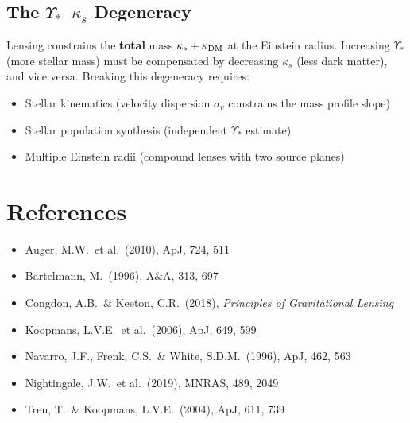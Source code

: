 \documentclass[11pt, letterpaper]{article}
\begin{document}
\subsection{The $\Upsilon_*$--$\kappa_s$ Degeneracy}

Lensing constrains the \textbf{total} mass $\kappa_* + \kappa_{\rm DM}$
at the Einstein radius. Increasing $\Upsilon_*$ (more stellar mass)
must be compensated by decreasing $\kappa_s$ (less dark matter), and
vice versa. Breaking this degeneracy requires:
\begin{itemize}[nosep]
  \item Stellar kinematics (velocity dispersion $\sigma_v$ constrains
    the mass profile slope)
  \item Stellar population synthesis (independent $\Upsilon_*$ estimate)
  \item Multiple Einstein radii (compound lenses with two source planes)
\end{itemize}

\section*{References}

\begin{itemize}[nosep, leftmargin=*]
  \item Auger, M.W.\ et al.\ (2010), ApJ, 724, 511
  \item Bartelmann, M.\ (1996), A\&A, 313, 697
  \item Congdon, A.B.\ \& Keeton, C.R.\ (2018), \emph{Principles of Gravitational Lensing}
  \item Koopmans, L.V.E.\ et al.\ (2006), ApJ, 649, 599
  \item Navarro, J.F., Frenk, C.S.\ \& White, S.D.M.\ (1996), ApJ, 462, 563
  \item Nightingale, J.W.\ et al.\ (2019), MNRAS, 489, 2049
  \item Treu, T.\ \& Koopmans, L.V.E.\ (2004), ApJ, 611, 739
\end{itemize}
\end{document}
